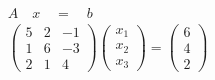 \documentclass[preview]{standalone}
\begin{document}
\begin{align*}
A \quad x \quad = \quad b \\ \begin{pmatrix} 5 & 2 & -1 \\ 1 & 6 & -3 \\ 2 & 1 & 4 \end{pmatrix} \begin{pmatrix} x_1 \\ x_2 \\ x_3 \end{pmatrix} = \begin{pmatrix} 6 \\ 4 \\ 2 \end{pmatrix}
\end{align*}
\end{document}
